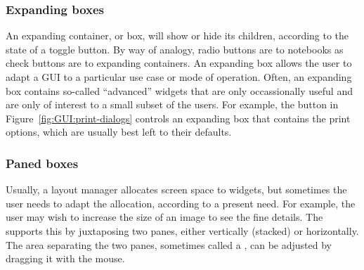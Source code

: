 

\subsubsection{Expanding boxes}
\label{sec:GUI:expanding-boxes}

An expanding container, or box, will show or hide its children, according to the
state of a toggle button. By way of analogy, radio buttons are to
notebooks as check buttons are to expanding containers. An expanding box
allows the user to adapt a GUI to a particular use case or mode of
operation. Often, an expanding box contains so-called ``advanced''
widgets that are only occassionally useful and are only of interest to
a small subset of the users. For example, the  button in
Figure~\ref{fig:GUI:print-dialogs} controls an expanding box that
contains the print options, which are usually best left to their
defaults.

\subsubsection{Paned boxes}
\label{sec:GUI:paned-boxes}

Usually, a layout manager allocates screen space to widgets, but
sometimes the user needs to adapt the allocation, according to a
present need. For example, the user may wish to increase the size of
an image to see the fine details. The 
supports this by juxtaposing two panes, either vertically (stacked) or
horizontally. The area separating the two panes, sometimes called a
, can be adjusted by dragging it with the mouse.
   
